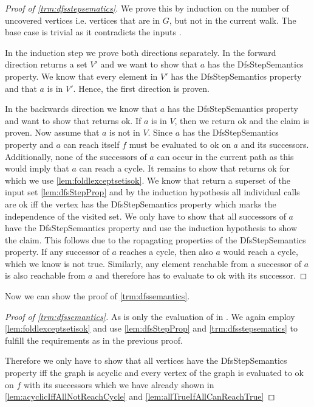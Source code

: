 \begin{proof}[Proof of \cref{trm:dfsstepsematics}]
  We prove this by induction on the number of uncovered vertices i.e. vertices that are in $G$, but not in the current walk. The base case is trivial as it contradicts the inputs \dfsstep.

  In the induction step we prove both directions separately. In the forward direction \dfsstep returns a set $V'$ and we want to show that $a$ has the DfsStepSemantics property. We know that every element in  $V'$ has the DfsStepSemantics property and that $a$ is in $V'$. Hence, the first direction is proven.

  In the backwards direction we know that $a$ has the DfsStepSemantics property and want to show that \dfsstep returns ok. If $a$ is in $V$, then we return ok and the claim is proven. Now assume that $a$ is not in $V$. Since $a$ has the DfsStepSemantics property and $a$ can reach itself $f$ must be evaluated to ok on $a$ and its successors. Additionally, none of the successors of $a$ can occur in the current path as this would imply that $a$ can reach a cycle. 
  It remains to show that \foldlexceptset returns ok for which we use \cref{lem:foldlexceptsetisok}. We know that \dfsstep return a superset of the input set \cref{lem:dfsStepProp} and by the induction hypothesis all individual calls are ok iff the vertex has the DfsStepSemantics property which marks the independence of the visited set. We only have to show that all successors of $a$ have the DfsStepSemantics property and use the induction hypothesis to show the claim. This follows due to the ropagating properties of the DfsStepSemantics property. If any successor of $a$ reaches a cycle, then also $a$ would reach a cycle, which we know is not true. Similarly, any element reachable from a successor of $a$ is also reachable from $a$ and therefore has to evaluate to ok with its successor.
\end{proof}

Now we can show the proof of \cref{trm:dfssemantics}.

\begin{proof}[Proof of \cref{trm:dfssemantics}]
  As \dfs is only the evaluation of \dfsstep in \foldlexceptset. We again employ \cref{lem:foldlexceptsetisok} and use \cref{lem:dfsStepProp} and \cref{trm:dfsstepsematics} to fulfill the requirements as in the previous proof. 

  Therefore we only have to show that all vertices have the DfsStepSemantics property iff the graph is acyclic and every vertex of the graph is evaluated to ok on $f$ with its successors which we have already shown in \cref{lem:acyclicIffAllNotReachCycle} and \cref{lem:allTrueIfAllCanReachTrue}
\end{proof}


